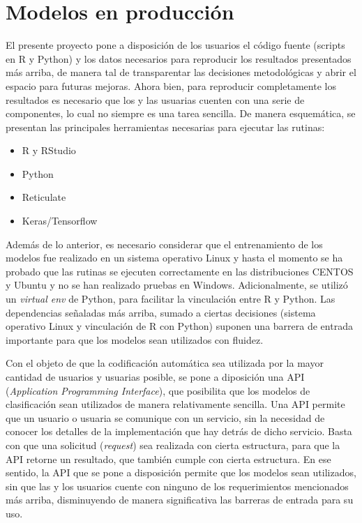 \documentclass[
  12pt,
  spanish,
]{article}
\providecommand{\tightlist}{%
  \setlength{\itemsep}{0pt}\setlength{\parskip}{0pt}}
\begin{document}
\newpage

\hypertarget{modelos-en-producciuxf3n}{%
\section{Modelos en producción}\label{modelos-en-producciuxf3n}}

El presente proyecto pone a disposición de los usuarios el código fuente
(scripts en R y Python) y los datos necesarios para reproducir los
resultados presentados más arriba, de manera tal de transparentar las
decisiones metodológicas y abrir el espacio para futuras mejoras. Ahora
bien, para reproducir completamente los resultados es necesario que los
y las usuarias cuenten con una serie de componentes, lo cual no siempre
es una tarea sencilla. De manera esquemática, se presentan las
principales herramientas necesarias para ejecutar las rutinas:

\begin{itemize}
\tightlist
\item
  R y RStudio
\item
  Python
\item
  Reticulate
\item
  Keras/Tensorflow
\end{itemize}

Además de lo anterior, es necesario considerar que el entrenamiento de
los modelos fue realizado en un sistema operativo Linux y hasta el
momento se ha probado que las rutinas se ejecuten correctamente en las
distribuciones CENTOS y Ubuntu y no se han realizado pruebas en Windows.
Adicionalmente, se utilizó un \emph{virtual env} de Python, para
facilitar la vinculación entre R y Python. Las dependencias señaladas
más arriba, sumado a ciertas decisiones (sistema operativo Linux y
vinculación de R con Python) suponen una barrera de entrada importante
para que los modelos sean utilizados con fluidez.

Con el objeto de que la codificación automática sea utilizada por la
mayor cantidad de usuarios y usuarias posible, se pone a diposición una
API (\emph{Application Programming Interface}), que posibilita que los
modelos de clasificación sean utilizados de manera relativamente
sencilla. Una API permite que un usuario o usuaria se comunique con un
servicio, sin la necesidad de conocer los detalles de la implementación
que hay detrás de dicho servicio. Basta con que una solicitud
(\emph{request}) sea realizada con cierta estructura, para que la API
retorne un resultado, que también cumple con cierta estructura. En ese
sentido, la API que se pone a disposición permite que los modelos sean
utilizados, sin que las y los usuarios cuente con ninguno de los
requerimientos mencionados más arriba, disminuyendo de manera
significativa las barreras de entrada para su uso.
\end{document}
